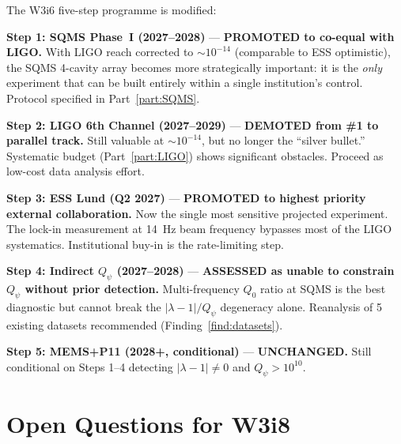 \documentclass[11pt]{article}
\newcommand{\lam}{\lambda}
\newcommand{\Qpsi}{Q_\psi}
\newcommand{\lbone}{|\lam - 1|}
\theoremstyle{definition}
\theoremstyle{remark}
\begin{document}
The W3i6 five-step programme is modified:

\begin{tcolorbox}[colback=blue!5!white, colframe=blue!50!black,
  title=\textbf{W3i7 Updated Five-Step Programme}]

\textbf{Step 1: SQMS Phase~I (2027--2028)} --- \textbf{PROMOTED to
co-equal with LIGO.}
  With LIGO reach corrected to $\sim 10^{-14}$ (comparable to
  ESS optimistic), the SQMS 4-cavity array becomes more strategically
  important: it is the \emph{only} experiment that can be built
  entirely within a single institution's control. Protocol specified
  in Part~\ref{part:SQMS}.

\textbf{Step 2: LIGO 6th Channel (2027--2029)} --- \textbf{DEMOTED
from \#1 to parallel track.}
  Still valuable at $\sim 10^{-14}$, but no longer the ``silver
  bullet.'' Systematic budget (Part~\ref{part:LIGO}) shows significant
  obstacles. Proceed as low-cost data analysis effort.

\textbf{Step 3: ESS Lund (Q2 2027)} --- \textbf{PROMOTED to highest
  priority external collaboration.}
  Now the single most sensitive projected experiment. The lock-in
  measurement at 14~Hz beam frequency bypasses most of the LIGO
  systematics. Institutional buy-in is the rate-limiting step.

\textbf{Step 4: Indirect $\Qpsi$ (2027--2028)} --- \textbf{ASSESSED as
  unable to constrain $\Qpsi$ without prior detection.}
  Multi-frequency $Q_0$ ratio at SQMS is the best diagnostic but cannot
  break the $\lbone/\Qpsi$ degeneracy alone. Reanalysis of 5 existing
  datasets recommended (Finding~\ref{find:datasets}).

\textbf{Step 5: MEMS+P11 (2028+, conditional)} --- \textbf{UNCHANGED.}
  Still conditional on Steps 1--4 detecting $\lbone \neq 0$ and
  $\Qpsi > 10^{10}$.
\end{tcolorbox}

\section{Open Questions for W3i8}
\label{sec:open_questions}
\end{document}
